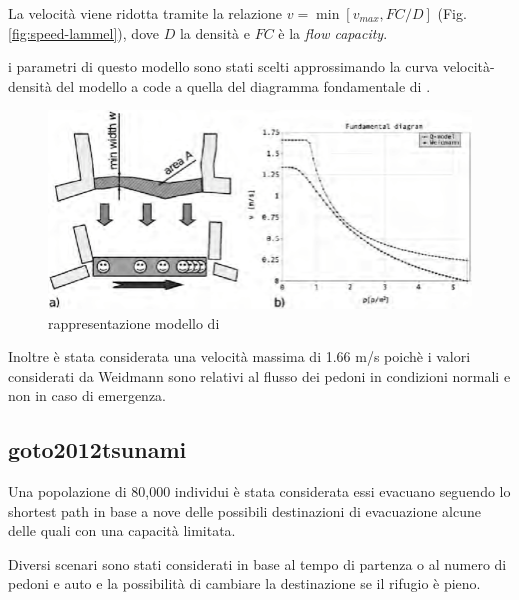 \vspace*{5mm}

La velocità viene ridotta tramite la relazione $v = \min[v_{max}, FC / D]$ (Fig. \ref{fig:speed-lammel}),
dove $D$ la densità e $FC$ è la \textit{flow capacity}.

\vspace*{5mm}

i parametri di questo modello sono stati scelti approssimando la curva velocità-densità del modello a code a quella
del diagramma fondamentale di \textcite{weidmann1993transporttechnik}.

\begin{figure}[ht]
    \centering
    \includegraphics[width=\textwidth]{images/speed_lammel.png}
    \caption{rappresentazione modello di \textcite[]{lammel2010emergency}}
    \label{fig:asdkasdasd}
\end{figure}

Inoltre è stata considerata una velocità massima di 1.66 m/s poichè i valori considerati da Weidmann sono relativi
al flusso dei pedoni in condizioni normali e non in caso di emergenza.



\subsection{goto2012tsunami}
Una popolazione di 80,000 individui è stata considerata essi evacuano seguendo 
lo shortest path in base a nove delle possibili destinazioni di evacuazione alcune delle quali con una capacità limitata.

\vspace*{5mm}

Diversi scenari sono stati considerati in base al tempo di partenza o al numero di pedoni e auto
e la possibilità di cambiare la destinazione se il rifugio è pieno.

\vspace*{5mm}

